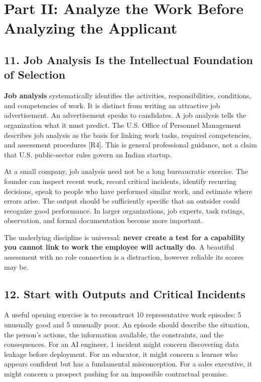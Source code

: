 \section*{Part II: Analyze the Work Before Analyzing the Applicant}

\subsection*{11. Job Analysis Is the Intellectual Foundation of Selection}

\textbf{Job analysis} systematically identifies the activities, responsibilities, conditions, and competencies of work. It is distinct from writing an attractive job advertisement. An advertisement speaks to candidates. A job analysis tells the organization what it must predict. The U.S. Office of Personnel Management describes job analysis as the basis for linking work tasks, required competencies, and assessment procedures [R4]. This is general professional guidance, not a claim that U.S. public-sector rules govern an Indian startup.

At a small company, job analysis need not be a long bureaucratic exercise. The founder can inspect recent work, record critical incidents, identify recurring decisions, speak to people who have performed similar work, and estimate where errors arise. The output should be sufficiently specific that an outsider could recognize good performance. In larger organizations, job experts, task ratings, observation, and formal documentation become more important.

The underlying discipline is universal: \textbf{never create a test for a capability you cannot link to work the employee will actually do}. A beautiful assessment with no role connection is a distraction, however reliable its scores may be.

\subsection*{12. Start with Outputs and Critical Incidents}

A useful opening exercise is to reconstruct 10 representative work episodes: 5 unusually good and 5 unusually poor. An episode should describe the situation, the person's actions, the information available, the constraints, and the consequences. For an AI engineer, 1 incident might concern discovering data leakage before deployment. For an educator, it might concern a learner who appears confident but has a fundamental misconception. For a sales executive, it might concern a prospect pushing for an impossible contractual promise.


